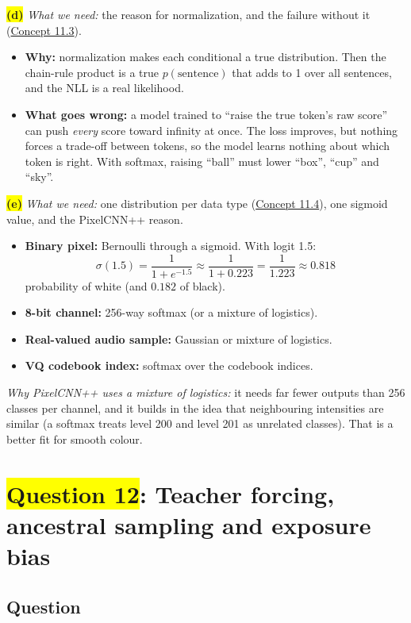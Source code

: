 \documentclass[12pt,a4paper]{article}
\begin{document}
\colorbox{yellow}{\textbf{(d)}} \emph{What we need:} the reason for normalization, and the failure without it (\hyperref[c11-3]{Concept 11.3}).
\begin{itemize}[nosep]
  \item \textbf{Why:} normalization makes each conditional a true distribution. Then the chain-rule product is a true $p(\text{sentence})$ that adds to 1 over all sentences, and the NLL is a real likelihood.
  \item \textbf{What goes wrong:} a model trained to ``raise the true token's raw score'' can push \emph{every} score toward infinity at once. The loss improves, but nothing forces a trade-off between tokens, so the model learns nothing about which token is right. With softmax, raising ``ball'' must lower ``box'', ``cup'' and ``sky''.
\end{itemize}

\colorbox{yellow}{\textbf{(e)}} \emph{What we need:} one distribution per data type (\hyperref[c11-4]{Concept 11.4}), one sigmoid value, and the PixelCNN++ reason.
\begin{itemize}[nosep]
  \item \textbf{Binary pixel:} Bernoulli through a sigmoid. With logit 1.5:
  \[
  \sigma(1.5)=\frac{1}{1+e^{-1.5}}\approx\frac{1}{1+0.223}=\frac{1}{1.223}\approx0.818
  \]
  probability of white (and $0.182$ of black).
  \item \textbf{8-bit channel:} 256-way softmax (or a mixture of logistics).
  \item \textbf{Real-valued audio sample:} Gaussian or mixture of logistics.
  \item \textbf{VQ codebook index:} softmax over the codebook indices.
\end{itemize}
\emph{Why PixelCNN++ uses a mixture of logistics:} it needs far fewer outputs than 256 classes per channel, and it builds in the idea that neighbouring intensities are similar (a softmax treats level 200 and level 201 as unrelated classes). That is a better fit for smooth colour.
\newpage
\section{\texorpdfstring{\colorbox{yellow}{Question 12}}{Question 12}: Teacher forcing, ancestral sampling and exposure bias}

\subsection{Question}
\end{document}
